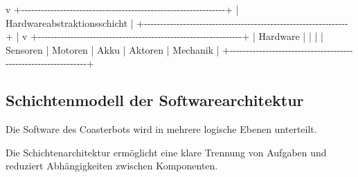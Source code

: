 \documentclass[
  a4paper,
  12pt,
  DIV=12,        %
  parskip=half,  %
  headings=small %
]{scrartcl}
\theoremstyle{definition}
\theoremstyle{definition}
\newenvironment{Shaded}{}{}
\newcommand{\NormalTok}[1]{#1}
\begin{document}
\begin{Shaded}
\begin{Highlighting}[]
\NormalTok{                             v}
\NormalTok{+{-}{-}{-}{-}{-}{-}{-}{-}{-}{-}{-}{-}{-}{-}{-}{-}{-}{-}{-}{-}{-}{-}{-}{-}{-}{-}{-}{-}{-}{-}{-}{-}{-}{-}{-}{-}{-}{-}{-}{-}{-}{-}{-}{-}{-}{-}{-}{-}{-}{-}{-}{-}{-}{-}{-}{-}{-}{-}{-}{-}{-}{-}{-}+}
\NormalTok{|              Hardwareabstraktionsschicht                      |}
\NormalTok{+{-}{-}{-}{-}{-}{-}{-}{-}{-}{-}{-}{-}{-}{-}{-}{-}{-}{-}{-}{-}{-}{-}{-}{-}{-}{-}{-}{-}{-}{-}{-}{-}{-}{-}{-}{-}{-}{-}{-}{-}{-}{-}{-}{-}{-}{-}{-}{-}{-}{-}{-}{-}{-}{-}{-}{-}{-}{-}{-}{-}{-}{-}{-}+}
\NormalTok{                             |}
\NormalTok{                             v}
\NormalTok{+{-}{-}{-}{-}{-}{-}{-}{-}{-}{-}{-}{-}{-}{-}{-}{-}{-}{-}{-}{-}{-}{-}{-}{-}{-}{-}{-}{-}{-}{-}{-}{-}{-}{-}{-}{-}{-}{-}{-}{-}{-}{-}{-}{-}{-}{-}{-}{-}{-}{-}{-}{-}{-}{-}{-}{-}{-}{-}{-}{-}{-}{-}{-}+}
\NormalTok{|                       Hardware                                |}
\NormalTok{|                                                               |}
\NormalTok{| Sensoren | Motoren | Akku | Aktoren | Mechanik                |}
\NormalTok{+{-}{-}{-}{-}{-}{-}{-}{-}{-}{-}{-}{-}{-}{-}{-}{-}{-}{-}{-}{-}{-}{-}{-}{-}{-}{-}{-}{-}{-}{-}{-}{-}{-}{-}{-}{-}{-}{-}{-}{-}{-}{-}{-}{-}{-}{-}{-}{-}{-}{-}{-}{-}{-}{-}{-}{-}{-}{-}{-}{-}{-}{-}{-}+}
\end{Highlighting}
\end{Shaded}

\subsection{Schichtenmodell der
Softwarearchitektur}\label{schichtenmodell-der-softwarearchitektur}

Die Software des Coasterbots wird in mehrere logische Ebenen unterteilt.

Die Schichtenarchitektur ermöglicht eine klare Trennung von Aufgaben und
reduziert Abhängigkeiten zwischen Komponenten.
\end{document}

